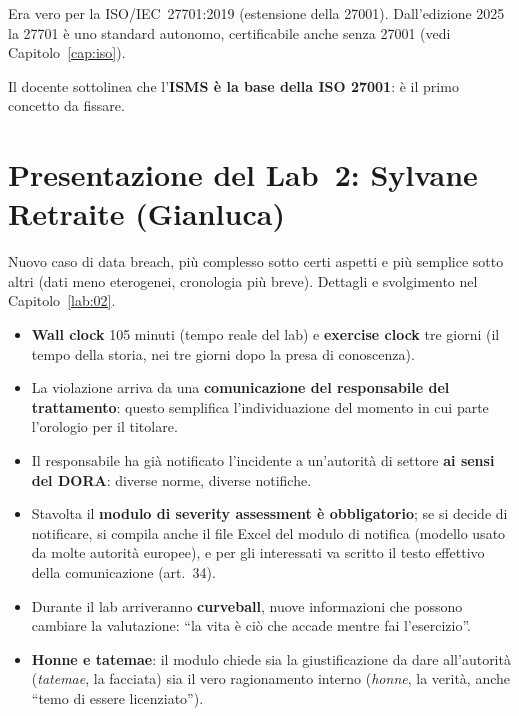 \begin{integrazione}
Era vero per la ISO/IEC~27701:2019 (estensione della 27001). Dall'edizione 2025 la 27701 è uno standard
autonomo, certificabile anche senza 27001 (vedi Capitolo~\ref{cap:iso}).
\end{integrazione}

\begin{esame}
Il docente sottolinea che l'\textbf{ISMS è la base della ISO 27001}: è il primo concetto da fissare.
\end{esame}

\section{Presentazione del Lab~2: Sylvane Retraite (Gianluca)}
Nuovo caso di data breach, più complesso sotto certi aspetti e più semplice sotto altri (dati meno
eterogenei, cronologia più breve). Dettagli e svolgimento nel Capitolo~\ref{lab:02}.
\begin{itemize}
  \item \textbf{Wall clock} 105 minuti (tempo reale del lab) e \textbf{exercise clock} tre giorni (il
    tempo della storia, nei tre giorni dopo la presa di conoscenza).
  \item La violazione arriva da una \textbf{comunicazione del responsabile del trattamento}: questo
    semplifica l'individuazione del momento in cui parte l'orologio per il titolare.
  \item Il responsabile ha già notificato l'incidente a un'autorità di settore \textbf{ai sensi del
    DORA}: diverse norme, diverse notifiche.
  \item Stavolta il \textbf{modulo di severity assessment è obbligatorio}; se si decide di notificare,
    si compila anche il file Excel del modulo di notifica (modello usato da molte autorità europee), e
    per gli interessati va scritto il testo effettivo della comunicazione (art.~34).
  \item Durante il lab arriveranno \textbf{curveball}, nuove informazioni che possono cambiare la
    valutazione: ``la vita è ciò che accade mentre fai l'esercizio''.
  \item \textbf{Honne e tatemae}: il modulo chiede sia la giustificazione da dare all'autorità
    (\emph{tatemae}, la facciata) sia il vero ragionamento interno (\emph{honne}, la verità, anche
    ``temo di essere licenziato'').
\end{itemize}

